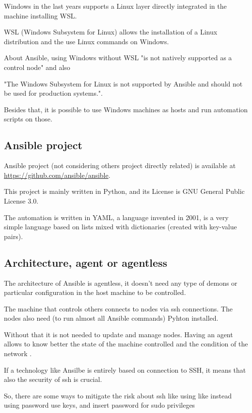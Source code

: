 \documentclass[12pt,a4paper,openright,twoside]{book}
\begin{document}
Windows in the last years supports a Linux layer directly integrated in the machine installing WSL.

WSL (Windows Subsystem for Linux) allows the installation of a Linux distribution and the use Linux commands on Windows.


About Ansible, using Windows without WSL "is not natively supported as a control node"\cite{ansibleDocInstallIntro} and also


"The Windows Subsystem for Linux is not supported by Ansible and should not be used for production systems."\cite{ansibleWinFaq}.


Besides that, it is possible to use Windows machines as hosts and run automation scripts on those.

\subsection{Ansible project}

Ansible project (not considering others project directly related) is available at \url{https://github.com/ansible/ansible}\cite{ansibleGithub}.


This project is mainly written in Python, and its License is GNU General Public License 3.0.


The automation is written in YAML, a language invented in 2001, is a very simple language based on lists mixed with dictionaries (created with key-value pairs).

\subsection{Architecture, agent or agentless}


The architecture of Ansible is agentless, it doesn't need any type of demons or particular configuration in the host machine to be controlled.


The machine that controls others connects to nodes via ssh connections. The nodes also need (to run almost all Ansible commands) Pyhton installed.


Without that it is not needed to update and manage nodes. Having an agent allows to know better the state of the machine controlled and the condition of the network .


If a technology like Ansilbe is entirely based on connection to SSH, it means that also the security of ssh is crucial.


So, there are some ways to mitigate the risk about ssh like using like instead using password use keys, and insert password for sudo privileges\cite{ansibleSSH}
\end{document}
